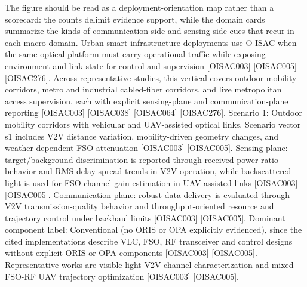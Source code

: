 {}The figure should be read as a deployment-orientation map rather than a scorecard: the counts delimit evidence support, while the domain cards summarize the kinds of communication-side and sensing-side cues that recur in each macro domain.\markdownRendererInterblockSeparator
{}\markdownRendererSectionBegin
\markdownRendererSectionBegin
{}\markdownRendererInterblockSeparator
{}\markdownRendererSectionBegin
{}\markdownRendererInterblockSeparator
{}Urban smart-infrastructure deployments use O-ISAC when the same optical platform must carry operational traffic while exposing environment and link state for control and supervision [O\markdownRendererUnderscore{}ISAC\markdownRendererUnderscore{}003] [O\markdownRendererUnderscore{}ISAC\markdownRendererUnderscore{}005] [O\markdownRendererUnderscore{}ISAC\markdownRendererUnderscore{}276]. Across representative studies, this vertical covers outdoor mobility corridors, metro and industrial cabled-fiber corridors, and live metropolitan access supervision, each with explicit sensing-plane and communication-plane reporting [O\markdownRendererUnderscore{}ISAC\markdownRendererUnderscore{}003] [O\markdownRendererUnderscore{}ISAC\markdownRendererUnderscore{}038] [O\markdownRendererUnderscore{}ISAC\markdownRendererUnderscore{}064] [O\markdownRendererUnderscore{}ISAC\markdownRendererUnderscore{}276].\markdownRendererInterblockSeparator
{}
\markdownRendererSectionEnd \markdownRendererSectionBegin
{}\markdownRendererInterblockSeparator
{}Scenario 1: Outdoor mobility corridors with vehicular and UAV-assisted optical links.\markdownRendererHardLineBreak
{}Scenario vector s1 includes V2V distance variation, mobility-driven geometry changes, and weather-dependent FSO attenuation [O\markdownRendererUnderscore{}ISAC\markdownRendererUnderscore{}003] [O\markdownRendererUnderscore{}ISAC\markdownRendererUnderscore{}005]. Sensing plane: target/background discrimination is reported through received-power-ratio behavior and RMS delay-spread trends in V2V operation, while backscattered light is used for FSO channel-gain estimation in UAV-assisted links [O\markdownRendererUnderscore{}ISAC\markdownRendererUnderscore{}003] [O\markdownRendererUnderscore{}ISAC\markdownRendererUnderscore{}005]. Communication plane: robust data delivery is evaluated through V2V transmission-quality behavior and throughput-oriented resource and trajectory control under backhaul limits [O\markdownRendererUnderscore{}ISAC\markdownRendererUnderscore{}003] [O\markdownRendererUnderscore{}ISAC\markdownRendererUnderscore{}005]. Dominant component label: Conventional (no ORIS or OPA explicitly evidenced), since the cited implementations describe VLC, FSO, RF transceiver and control designs without explicit ORIS or OPA components [O\markdownRendererUnderscore{}ISAC\markdownRendererUnderscore{}003] [O\markdownRendererUnderscore{}ISAC\markdownRendererUnderscore{}005]. Representative works are visible-light V2V channel characterization and mixed FSO-RF UAV trajectory optimization [O\markdownRendererUnderscore{}ISAC\markdownRendererUnderscore{}003] [O\markdownRendererUnderscore{}ISAC\markdownRendererUnderscore{}005].\markdownRendererParagraphSeparator
